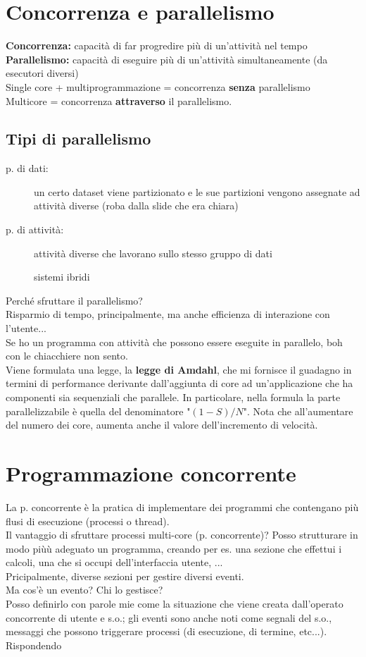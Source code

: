 \section{Concorrenza e parallelismo}
\textbf{Concorrenza:} capacità di far progredire più di un'attività nel tempo
\\\textbf{Parallelismo:} capacità di eseguire più di un'attività simultaneamente (da esecutori diversi)
\\Single core + multiprogrammazione = concorrenza \textbf{senza} parallelismo
\\Multicore = concorrenza \textbf{attraverso} il parallelismo.

\subsection{Tipi di parallelismo}
\begin{description}
    \item[p. di dati:] un certo dataset viene partizionato e le sue partizioni vengono assegnate ad attività diverse (roba dalla slide che era chiara)
    \item[p. di attività:] attività diverse che lavorano sullo stesso gruppo di dati
    \item[] sistemi ibridi
\end{description}
Perché sfruttare il parallelismo?
\\Risparmio di tempo, principalmente, ma anche efficienza di interazione con l'utente...
\\Se ho un programma con attività che possono essere eseguite in parallelo, boh con le chiacchiere non sento.
\\Viene formulata una legge, la \textbf{legge di Amdahl}, che mi fornisce il guadagno in termini di performance derivante dall'aggiunta di core ad un'applicazione che ha componenti sia sequenziali che parallele. In particolare, nella formula la parte parallelizzabile è quella del denominatore "$(1-S)/N$". Nota che all'aumentare del numero dei core, aumenta anche il valore dell'incremento di velocità.

\section{Programmazione concorrente}
La p. concorrente è la pratica di implementare dei programmi che contengano più flusi di esecuzione (processi o thread).
\\Il vantaggio di sfruttare processi multi-core (p. concorrente)? Posso strutturare in modo piùù adeguato un programma, creando per es. una sezione che effettui i calcoli, una che si occupi dell'interfaccia utente, ...
\\Pricipalmente, diverse sezioni per gestire diversi eventi.
\\Ma cos'è un evento? Chi lo gestisce?
\\Posso definirlo con parole mie come la situazione che viene creata dall'operato concorrente di utente e s.o.; gli eventi sono anche noti come segnali del s.o., messaggi che possono triggerare processi (di esecuzione, di termine, etc...). Rispondendo 

